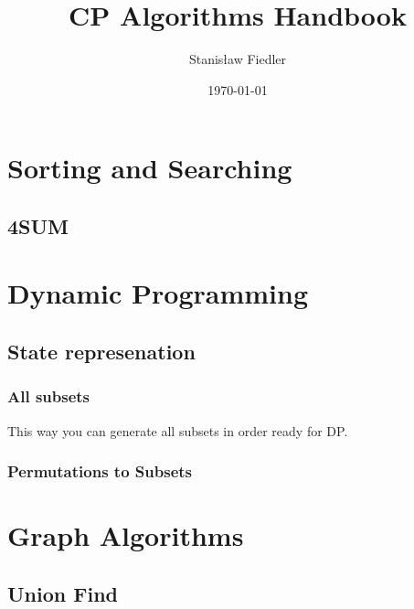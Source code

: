 \documentclass[13pt]{article}
\title{ \vspace{-1cm}
	CP Algorithms Handbook}
\author{Stanisław Fiedler}
\date{\today}
\begin{document}
\maketitle
\tableofcontents
\pagebreak

\tableofcontents
\pagebreak

\section{Sorting and Searching}

\subsection{4SUM}

\section{Dynamic Programming}

\subsection{State represenation}\label{sub:state_represenation} %

\subsubsection{All subsets}\label{ssub:all_subsets} %
This way you can generate all subsets in order ready for DP.


\subsubsection{Permutations to Subsets}\label{ssub:permutations_to_subsets} %



\section{Graph Algorithms}

\subsection{Union Find}\label{sub:union_find} %

\end{document}
